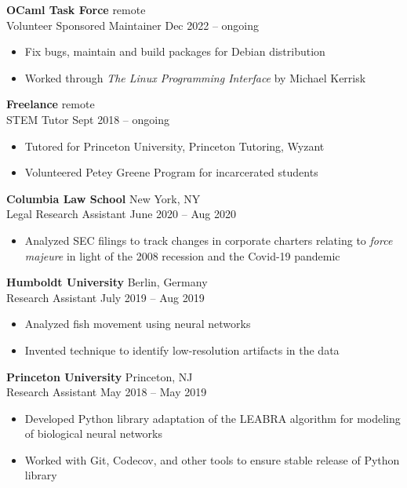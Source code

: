 \documentclass[12pt]{article}
\newcommand{\entry}[4]{{{\textbf{#1}}} \hfill #3 \\ #2 \hfill #4}
\begin{document}
\begin{paracol}{2}
\entry{OCaml Task Force}{Volunteer Sponsored Maintainer}{remote}{Dec 2022 -- ongoing}
\begin{itemize}[noitemsep,leftmargin=3.5mm,rightmargin=0mm,topsep=6pt]
  \item Fix bugs, maintain and build packages for Debian distribution
  \item Worked through \textit{The Linux Programming Interface} by Michael Kerrisk
\end{itemize}

\smallskip

\entry{Freelance}{STEM Tutor}{remote}{Sept 2018 -- ongoing}
\begin{itemize}[noitemsep,leftmargin=3.5mm,rightmargin=0mm,topsep=6pt]
  \item Tutored for Princeton University, Princeton Tutoring, Wyzant
  \item Volunteered Petey Greene Program for incarcerated students
\end{itemize}

\smallskip

\entry{Columbia Law School}{Legal Research Assistant}{New York, NY}{June 2020 -- Aug 2020}
\begin{itemize}[noitemsep,leftmargin=3.5mm,rightmargin=0mm,topsep=6pt]
  \item Analyzed SEC filings to track changes in corporate charters relating to \textit{force majeure} in light of the 2008 recession and the Covid-19 pandemic
\end{itemize}

\smallskip

\entry{Humboldt University}{Research Assistant}{Berlin, Germany}{July 2019 -- Aug 2019}
\begin{itemize}[noitemsep,leftmargin=3.5mm,rightmargin=0mm,topsep=6pt]
  \item Analyzed fish movement using neural
networks
  \item Invented technique to identify low-resolution artifacts in the data
\end{itemize}

\smallskip

\entry{Princeton University}{Research Assistant}{Princeton, NJ}{May 2018 -- May 2019}
\begin{itemize}[noitemsep,leftmargin=3.5mm,rightmargin=0mm,topsep=6pt]
  \item Developed Python library adaptation of the LEABRA algorithm for modeling of biological neural networks
  \item Worked with Git, Codecov, and other tools to ensure stable release of Python library
\end{itemize}


\end{paracol}
\end{document}
